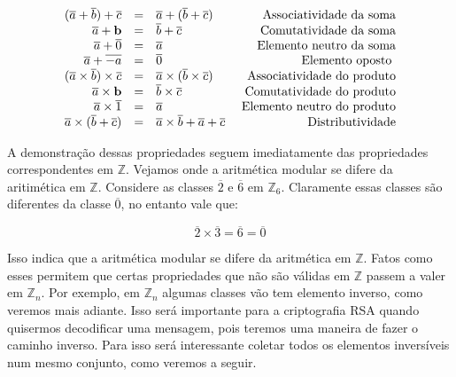 \[
\begin{array}{rclr}
(\overline{a}+\overline{b})+\overline{c} &=& \overline{a}+(\overline{b}+\overline{c}) & \hfill\textrm{ Associatividade da soma}\\
\overline{a}+\textbf{b}									 &=& \overline{b}+\overline{c} 								& \hfill\textrm{ Comutatividade da soma}\\
\overline{a}+\overline{0} 							 &=& \overline{a} 														& \hfill\textrm{ Elemento neutro da soma}\\
\overline{a}+\overline{-a}							 &=& \overline{0} 														& \hfill\textrm{ Elemento oposto }\\
(\overline{a}\times\overline{b})\times\overline{c} &=& \overline{a}\times(\overline{b}\times\overline{c}) & \hfill\textrm{ Associatividade do produto}\\
\overline{a}\times\textbf{b}								 &=& \overline{b}\times\overline{c} 								& \hfill\textrm{ Comutatividade do produto}\\
\overline{a}\times\overline{1} 							 &=& \overline{a} 														& \hfill\textrm{ Elemento neutro do produto}\\
\overline{a}\times(\overline{b}+\overline{c})&=& \overline{a}\times\overline{b}+\overline{a}+\overline{c} 														& \hfill\textrm{ Distributividade}\\
\end{array}
\]

A demonstra\c{c}\~{a}o dessas propriedades seguem imediatamente das propriedades correspondentes em $\mathbb{Z}$.
Vejamos onde a aritm\'{e}tica modular se difere da aritim\'{e}tica em $\mathbb{Z}$. Considere as classes 
$\overline{2}$ e $\overline{6}$ em $\mathbb{Z}_{6}$. Claramente essas classes s\~{a}o diferentes
da classe $\overline{0}$, no entanto vale que:

$$\overline{2}\times\overline{3}=\overline{6}=\overline{0}$$
 
Isso indica que a aritm\'{e}tica modular se difere da aritm\'{e}tica em $\mathbb{Z}$. Fatos como esses 
permitem que certas propriedades que n\~{a}o s\~{a}o v\'{a}lidas em $\mathbb{Z}$ passem a valer em $\mathbb{Z}_{n}$. 
Por exemplo, em $\mathbb{Z}_{n}$ algumas classes v\~{a}o tem elemento inverso, como veremos mais adiante. 
Isso ser\'{a} importante para a criptografia RSA quando quisermos decodificar uma mensagem, pois teremos uma maneira de 
fazer o caminho inverso. Para isso ser\'{a} interessante coletar todos os elementos invers\'{i}veis num mesmo conjunto, 
como veremos a seguir.

